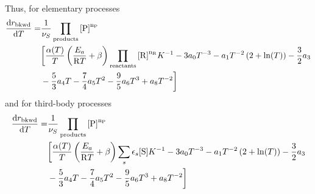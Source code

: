 Thus, for elementary processes
\begin{equation}
\begin{split}
\doverdT{\rateb} =& \frac{1}{\scoef[S]} \prodProd \\
&\bigg[
        \frac{\kinMod}{T} \left(\frac{E_a}{\Rg T} + \beta\right)\prodReac \Eqconst^{-1}
                  - 3\tc{0}T^{-3} - \tc{1} T^{-2} \left(2 + \ln(T)\right) - \frac{3}{2} \tc{3} \\
&                 - \frac{5}{3} \tc{4} T - \frac{7}{4}\tc{5} T^2 - \frac{9}{5}\tc{6} T^3 + \tc{8} T^{-2} \bigg]
\end{split}
\end{equation}
and for third-body processes
\begin{equation}
\begin{split}
\doverdT{\rateb} =& \frac{1}{\scoef[S]} \prodProd \\
&\bigg[
        \frac{\kinMod}{T} \left(\frac{E_a}{\Rg T} + \beta\right) \threeBody \Eqconst^{-1} 
                  - 3\tc{0}T^{-3} - \tc{1} T^{-2} \left(2 + \ln(T)\right) - \frac{3}{2} \tc{3} \\
&                 - \frac{5}{3} \tc{4} T - \frac{7}{4}\tc{5} T^2 - \frac{9}{5}\tc{6} T^3 + \tc{8} T^{-2} \bigg]
\end{split}
\end{equation}


